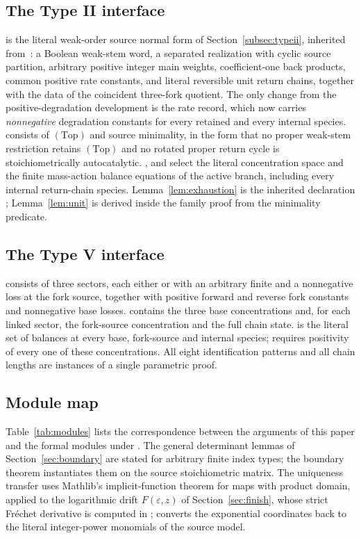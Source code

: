 \documentclass[11pt,a4paper]{article}
\theoremstyle{plain}
\theoremstyle{definition}
\theoremstyle{remark}
\numberwithin{equation}{section}
\newcommand{\Top}{\mathrm{(Top)}}
\begin{document}
\subsection*{The Type II interface}
 is the literal weak-order source normal form of Section~\ref{subsec:typeii}, inherited from~\cite{TypeIIpos}: a Boolean weak-stem word, a separated realization with cyclic source partition, arbitrary positive integer main weights, coefficient-one back products, common positive rate constants, and literal reversible unit return chains, together with the data of the coincident three-fork quotient. The only change from the positive-degradation development is the rate record, which now carries \emph{nonnegative} degradation constants for every retained and every internal species.  consists of $\Top$ and source minimality, in the form that no proper weak-stem restriction retains $\Top$ and no rotated proper return cycle is stoichiometrically autocatalytic. ,  and  select the literal concentration space and the finite mass-action balance equations of the active branch, including every internal return-chain species. Lemma~\ref{lem:exhaustion} is the inherited declaration ; Lemma~\ref{lem:unit} is derived inside the family proof from the minimality predicate.

\subsection*{The Type V interface}
 consists of three sectors, each either  or  with an arbitrary finite  and a nonnegative loss at the fork source, together with positive forward and reverse fork constants and nonnegative base losses.  contains the three base concentrations and, for each linked sector, the fork-source concentration and the full chain state.  is the literal set of balances at every base, fork-source and internal species;  requires positivity of every one of these concentrations. All eight identification patterns and all chain lengths are instances of a single parametric proof.

\subsection*{Module map}
Table~\ref{tab:modules} lists the correspondence between the arguments of this paper and the formal modules under . The general determinant lemmas of Section~\ref{sec:boundary} are stated for arbitrary finite index types; the boundary theorem instantiates them on the source stoichiometric matrix. The uniqueness transfer uses Mathlib's implicit-function theorem for maps with product domain, applied to the logarithmic drift $F(\varepsilon,z)$ of Section~\ref{sec:finish}, whose strict Fr\'echet derivative is computed in ;  converts the exponential coordinates back to the literal integer-power monomials of the source model.
\end{document}
